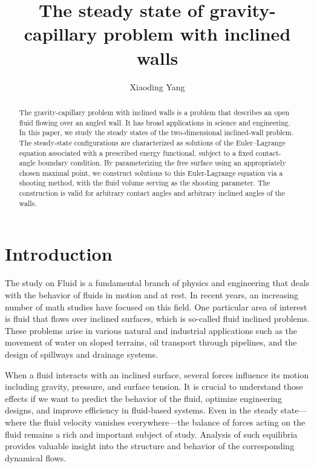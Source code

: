 \documentclass[letterpaper,reqno,10pt,twoside]{amsart}
\title{The steady state of gravity-capillary problem with inclined walls}
\author{Xiaoding Yang}
\theoremstyle{definition}
\theoremstyle{remark}
\begin{document}
\begin{abstract}
The gravity-capillary problem with inclined
walls is a problem that describes an open fluid flowing over an angled wall. It has broad applications in science and engineering. In this paper, we study the steady states of the two-dimensional inclined-wall problem. The steady-state configurations are characterized as solutions of the Euler–Lagrange equation associated with a prescribed energy functional, subject to a fixed contact-angle boundary condition. By parameterizing the free surface using an appropriately chosen maximal point, we construct solutions to this Euler-Lagrange equation via a shooting method, with the fluid volume serving as the shooting parameter. The construction is valid for arbitrary contact angles and arbitrary inclined angles of the walls. 
\end{abstract}

\maketitle

\pagestyle{myheadings} \thispagestyle{plain} 
\setcounter{tocdepth}{1}
\section{Introduction}


The study on Fluid is a fundamental branch of physics and engineering that deals with the behavior of fluids in motion and at rest. In recent years, an increasing number of math studies have focused on this field. One particular area of interest is fluid that flows over inclined surfaces, which is so-called fluid inclined problems. These problems arise in various natural and industrial applications such as the movement of water on sloped terrains, oil transport through pipelines, and the design of spillways and drainage systems\cite{app}.

When a fluid interacts with an inclined surface, several forces influence its motion including gravity, pressure, and surface tension. It is crucial to understand those effects if we want to predict the behavior of the fluid, optimize engineering designs, and improve efficiency in fluid-based systems. Even in the steady state—where the fluid velocity vanishes everywhere—the balance of forces acting on the fluid remains a rich and important subject of study. Analysis of such equilibria provides valuable insight into the structure and behavior of the corresponding dynamical flows. 
\end{document}
